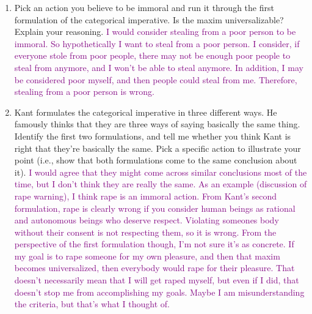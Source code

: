 \documentclass[12pt]{article}
\newcommand{\ans}[1]{\textcolor{purple}{#1}}
\begin{document}
\begin{enumerate}
    \item Pick an action you believe to be immoral and run it through the first formulation of the categorical imperative. Is the maxim universalizable? Explain your reasoning.
          \ans{I would consider stealing from a poor person to be immoral. So hypothetically I want to steal from a poor person. I consider, if everyone stole from poor people, there may not be enough poor people to steal from anymore, and I won't be able to steal anymore. In addition, I may be considered poor myself, and then people could steal from me. Therefore, stealing from a poor person is wrong.}
    \item Kant formulates the categorical imperative in three different ways. He famously thinks that they are three ways of saying basically the same thing. Identify the first two formulations, and tell me whether you think Kant is right that they're basically the same. Pick a specific action to illustrate your point (i.e., show that both formulations come to the same conclusion about it).
          \ans{I would agree that they might come across similar conclusions most of the time, but I don't think they are really the same. As an example (discussion of rape warning), I think rape is an immoral action. From Kant's second formulation, rape is clearly wrong if you consider human beings as rational and autonomous beings who deserve respect. Violating someones body without their consent is not respecting them, so it is wrong. From the perspective of the first formulation though, I'm not sure it's as concrete. If my goal is to rape someone for my own pleasure, and then that maxim becomes universalized, then everybody would rape for their pleasure. That doesn't necessarily mean that I will get raped myself, but even if I did, that doesn't stop me from accomplishing my goals. Maybe I am misunderstanding the criteria, but that's what I thought of.}
\end{enumerate}
\end{document}
